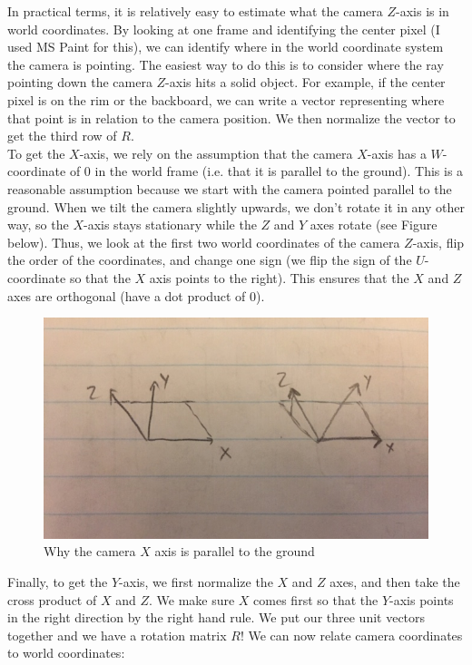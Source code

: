 \documentclass{article}
\begin{document}
In practical terms, it is relatively easy to estimate what the camera $Z$-axis is in world coordinates. By looking at one frame and identifying the center pixel (I used MS Paint for this), we can identify where in the world coordinate system the camera is pointing. The easiest way to do this is to consider where the ray pointing down the camera $Z$-axis hits a solid object. For example, if the center pixel is on the rim or the backboard, we can write a vector representing where that point is in relation to the camera position. We then normalize the vector to get the third row of $R$. \\

To get the $X$-axis, we rely on the assumption that the camera $X$-axis has a $W$-coordinate of 0 in the world frame (i.e. that it is parallel to the ground). This is a reasonable assumption because we start with the camera pointed parallel to the ground. When we tilt the camera slightly upwards, we don't rotate it in any other way, so the $X$-axis stays stationary while the $Z$ and $Y$ axes rotate (see Figure below). Thus, we look at the first two world coordinates of the camera $Z$-axis, flip the order of the coordinates, and change one sign (we flip the sign of the $U$-coordinate so that the $X$ axis points to the right). This ensures that the $X$ and $Z$ axes are orthogonal (have a dot product of 0). \\

\begin{figure}[H]
\includegraphics[scale=0.6]{Rotation_Diagram}
\centering
\caption{Why the camera $X$ axis is parallel to the ground}
\end{figure}

Finally, to get the $Y$-axis, we first normalize the $X$ and $Z$ axes, and then take the cross product of $X$ and $Z$. We make sure $X$ comes first so that the $Y$-axis points in the right direction by the right hand rule. We put our three unit vectors together and we have a rotation matrix $R$! We can now relate camera coordinates to world coordinates:
\end{document}
